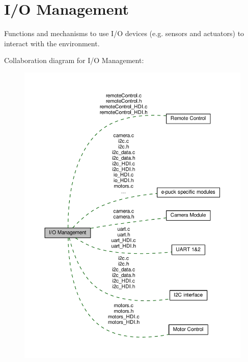 \hypertarget{group__io}{}\section{I/\+O Management}
\label{group__io}


Functions and mechanisms to use I/\+O devices (e.\+g. sensors and actuators) to interact with the environment.  


Collaboration diagram for I/\+O Management\+:\nopagebreak
\begin{figure}[H]
\begin{center}
\leavevmode
\includegraphics[width=350pt]{d2/da3/group__io}
\end{center}
\end{figure}
